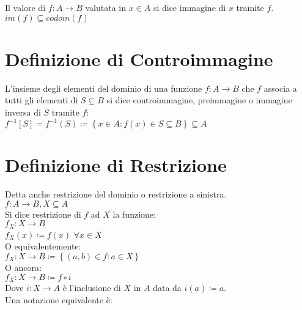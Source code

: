 \documentclass[a4paper, twoside, italian, 11pt]{book}
\newcommand{\braces}[1] {\left \{ #1 \right \}}
\begin{document}
\noindent
Il valore di $f : A \rightarrow B$ valutata in $x \in A$ si dice immagine di $x$ tramite $f$. \\

\noindent
$im(f) \subseteq codom(f)$



\section{Definizione di Controimmagine}

L'insieme degli elementi del dominio di una funzione $f : A \rightarrow B$ che $f$ associa a tutti gli elementi di $S \subseteq B$ si dice controimmagine, preimmagine o immagine inversa di $S$ tramite $f$: \\

$f^{-1}[S] = f^{-1}(S) \coloneqq \braces{x \in A : f(x) \in S \subseteq B} \subseteq A$



\section{Definizione di Restrizione}

Detta anche restrizione del dominio o restrizione a sinistra. \\

\noindent
$f : A \rightarrow B, X \subseteq A$ \\

\noindent
Si dice restrizione di $f$ ad $X$ la funzione: \\

$f_X : X \rightarrow B$ \\
\indent
$f_X(x) \coloneqq f(x)$ $\forall x \in X$ \\

\noindent
O equivalentemente: \\

$f_X : X \rightarrow B \coloneqq \braces{(a, b) \in f : a \in X}$ \\

\noindent
O ancora: \\

$f_X : X \rightarrow B \coloneqq f \circ i$ \\

\noindent
Dove $i : X \rightarrow A$ è l'inclusione di $X$ in $A$ data da $i(a) \coloneqq a$. \\

\noindent
Una notazione equivalente è: \\
\end{document}
